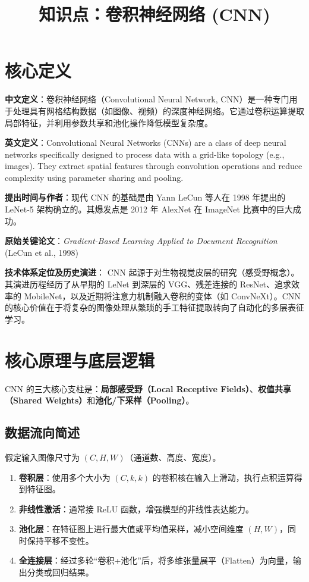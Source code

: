 \documentclass[12pt, a4paper]{article}
\title{知识点：卷积神经网络 (CNN)}
\author{}
\date{}
\begin{document}
\maketitle

\section{核心定义}
\textbf{中文定义}：卷积神经网络（Convolutional Neural Network, CNN）是一种专门用于处理具有网格结构数据（如图像、视频）的深度神经网络。它通过卷积运算提取局部特征，并利用参数共享和池化操作降低模型复杂度。

\textbf{英文定义}：Convolutional Neural Networks (CNNs) are a class of deep neural networks specifically designed to process data with a grid-like topology (e.g., images). They extract spatial features through convolution operations and reduce complexity using parameter sharing and pooling.

\textbf{提出时间与作者}：现代 CNN 的基础是由 Yann LeCun 等人在 1998 年提出的 LeNet-5 架构确立的。其爆发点是 2012 年 AlexNet 在 ImageNet 比赛中的巨大成功。

\textbf{原始关键论文}：\textit{Gradient-Based Learning Applied to Document Recognition} (LeCun et al., 1998)

\textbf{技术体系定位及历史演进}：
CNN 起源于对生物视觉皮层的研究（感受野概念）。其演进历程经历了从早期的 LeNet 到深层的 VGG、残差连接的 ResNet、追求效率的 MobileNet，以及近期将注意力机制融入卷积的变体（如 ConvNeXt）。CNN 的核心价值在于将复杂的图像处理从繁琐的手工特征提取转向了自动化的多层表征学习。

\section{核心原理与底层逻辑}
CNN 的三大核心支柱是：\textbf{局部感受野（Local Receptive Fields）}、\textbf{权值共享（Shared Weights）}和\textbf{池化/下采样（Pooling）}。

\subsection{数据流向简述}
假定输入图像尺寸为 $(C, H, W)$（通道数、高度、宽度）。
\begin{enumerate}
    \item \textbf{卷积层}：使用多个大小为 $(C, k, k)$ 的卷积核在输入上滑动，执行点积运算得到特征图。
    \item \textbf{非线性激活}：通常接 ReLU 函数，增强模型的非线性表达能力。
    \item \textbf{池化层}：在特征图上进行最大值或平均值采样，减小空间维度 $(H, W)$，同时保持平移不变性。
    \item \textbf{全连接层}：经过多轮“卷积+池化”后，将多维张量展平（Flatten）为向量，输出分类或回归结果。
\end{enumerate}
\end{document}

